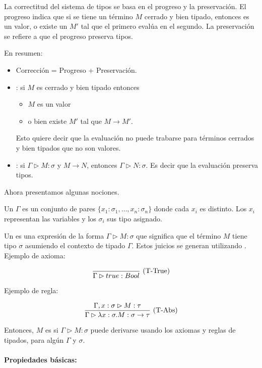 La correctitud del sistema de tipos se basa en el progreso y la preservación. El progreso indica que si se tiene un término $M$ cerrado y bien tipado, entonces es un valor, o existe un $M'$ tal que el primero evalúa en el segundo. La preservación se refiere a que el progreso preserva tipos.

En resumen:

\begin{itemize}
  \item Corrección = Progreso + Preservación.
  \item {}: si $M$ es cerrado y bien tipado entonces
    \begin{itemize}
      \item $M$ es un valor
      \item o bien existe $M'$ tal que $M \to M'$.
    \end{itemize}
    Esto quiere decir que la evaluación no puede trabarse para términos cerrados y bien tipados que no son valores.
  \item {}: si $\Gamma \rhd M : \sigma$ y $M \to N$, entonces $\Gamma \rhd N : \sigma$. Es decir que la evaluación preserva tipos.
\end{itemize}

Ahora presentamos algunas nociones.

Un  $\Gamma$ es un conjunto de pares $\{x_1:\sigma_1,\dots,x_n:\sigma_n\}$ donde cada $x_i$ es distinto. Los $x_i$ representan las variables y los $\sigma_i$ sus tipo asignado.

Un  es una expresión de la forma $\Gamma \rhd M : \sigma$ que significa que el término $M$ tiene tipo $\sigma$ asumiendo el contexto de tipado $\Gamma$. Estos juicios se generan utilizando . Ejemplo de axioma:

\[\frac{}{\Gamma \rhd true : Bool}\ \text{(T-True)}\]

Ejemplo de regla:

\[\frac{\Gamma, x : \sigma \rhd M : \tau}{\Gamma \rhd \lambda x:\sigma.M:\sigma\to\tau}\ \text{(T-Abs)}\]

\vspace{0.5em}
Entonces, $M$ es   si $\Gamma \rhd M : \sigma$ puede derivarse usando los axiomas y reglas de tipados, para algún $\Gamma$ y $\sigma$.

\paragraph{Propiedades básicas:}

